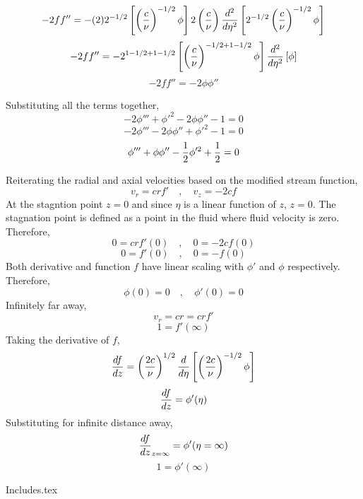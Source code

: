 \documentclass[class=report, 12pt, crop=false]{standalone}
\begin{document}
\begin{center}
$$-2ff'' = -(2)2^{-1/2}\left[\left(\frac{c}{\nu}\right)^{-1/2}\phi\right]2\left(\frac{c}{\nu}\right)\frac{d^2}{d\eta^2}\left[2^{-1/2}\left(\frac{c}{\nu}\right)^{-1/2}\phi\right]$$
$$-2ff'' = -2^{1-1/2+1-1/2}\left[\left(\frac{c}{\nu}\right)^{-1/2+1-1/2}\phi\right]\frac{d^2}{d\eta^2}\left[\phi\right]$$
$$-2ff'' = -2\phi\phi''$$

Substituting all the terms together,
$$-2\phi''' + \phi'^2 - 2\phi\phi'' - 1 = 0$$
$$-2\phi''' - 2\phi\phi'' + \phi'^2 - 1 = 0$$
$$\phi''' + \phi\phi'' - \frac{1}{2}\phi'^2 + \frac{1}{2} = 0$$

Reiterating the radial and axial velocities based on the modified stream function,
$$v_r =  crf' \quad,\quad v_z = -2cf$$
At the stagntion point $z=0$ and since $\eta$ is a linear function of $z$, $z=0$. The stagnation point is defined as a point in the fluid where fluid velocity is zero. Therefore,
$$0 =  crf'(0) \quad,\quad 0 = -2cf(0)$$
$$0 =  f'(0) \quad,\quad 0 = -f(0)$$
Both derivative and function $f$ have linear scaling with $\phi'$ and $\phi$ respectively. Therefore,
$$\phi(0)=0 \quad,\quad \phi'(0) = 0$$
Infinitely far away,
$$v_r = cr = crf'$$
$$1 = f'(\infty)$$
Taking the derivative of $f$,
$$\frac{df}{dz} = \left(\frac{2c}{\nu}\right)^{1/2}\frac{d}{d\eta}\left[\left(\frac{2c}{\nu}\right)^{-1/2}\phi\right]$$
$$\frac{df}{dz} = \phi'(\eta)$$
Substituting for infinite distance away,
$$\frac{df}{dz}_{z=\infty} = \phi'(\eta=\infty)$$
$$1 = \phi'(\infty)$$




{Includes.tex}


\end{center}
\end{document}
